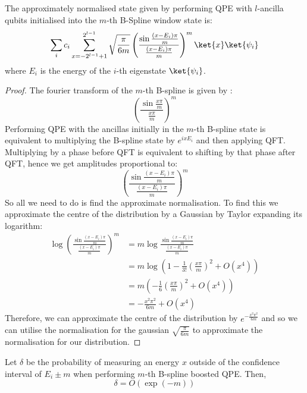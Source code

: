 \begin{lemma}
The approximately normalised state given by performing QPE with $l$-ancilla qubits initialised into the $m$-th B-Spline window state is:
\begin{equation}
    \sum_i c_i \sum_{x=-2^{l-1}+1}^{2^{l-1}} \sqrt{\frac{\pi}{6m}}\left(\frac{\sin \frac{(x-E_i)\pi}{m}}{ \frac{(x-E_i)\pi}{m}}\right)^m \ket{x}\ket{\psi_i}
\end{equation}
where $E_i$ is the energy of the $i$-th eigenstate $\ket{\psi_i}$.
\label{lemma:bspline_def}
\end{lemma}
\begin{proof}
    The fourier transform of the $m$-th B-spline is given by \cite{bspline}: \begin{equation}
        \left(\frac{\sin \frac{x\pi}{m}}{ \frac{x\pi}{m}}\right)^m
    \end{equation} 
    Performing QPE with the ancillas initially in the $m$-th B-spline state is equivalent to multiplying the B-spline state by $e^{ixE_i}$ and then applying QFT. Multiplying by a phase before QFT is equivalent to shifting by that phase after QFT, hence we get amplitudes proportional to:
    \begin{equation}
     \left(\frac{\sin \frac{(x-E_i)\pi}{m}}{ \frac{(x-E_i)\pi}{m}}\right)^m 
\end{equation}
    So all we need to do is find the approximate normalisation. To find this we approximate the centre of the distribution by a Gaussian by Taylor expanding its logarithm:
    \begin{align}
                \log \left(\frac{\sin \frac{(x-E_i)\pi}{m}}{ \frac{(x-E_i)\pi}{m}}\right)^m &= m \log \frac{\sin \frac{(x-E_i)\pi}{m}}{ \frac{(x-E_i)\pi}{m}}\\
                &= m \log \left( 1 - \frac{1}{3!}(\frac{x\pi}{m})^2 + O(x^4) \right)\\ 
                &= m(- \frac{1}{6}(\frac{x\pi}{m})^2 + O(x^4))\\
                &= - \frac{x^2 \pi^2}{6m} + O(x^4)
    \end{align}
    Therefore, we can approximate the centre of the distribution by $e^{ - \frac{x^2 \pi^2}{6m}}$ and so we can utilise the normalisation for the gaussian $\sqrt{\frac{\pi}{6m}}$ to approximate the normalisation for our distribution.

\end{proof}
\begin{lemma}
    Let $\delta$ be the probability of measuring an energy $x$ outside of the confidence interval of $E_i\pm m$ when performing $m$-th B-spline boosted QPE. Then,
    \begin{equation}
        \delta = O\left(\exp (-m)\right)
    \end{equation}
    \label{lemma:bspline_prob}
\end{lemma}
